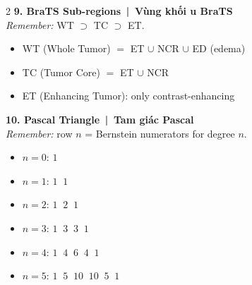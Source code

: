 \begin{multicols}{2}
\textbf{9. BraTS Sub-regions \,|\, Vùng khối u BraTS}\\
\emph{Remember:} WT $\supset$ TC $\supset$ ET.
\begin{itemize}
\item WT (Whole Tumor) $=$ ET $\cup$ NCR $\cup$ ED (edema)
\item TC (Tumor Core) $=$ ET $\cup$ NCR
\item ET (Enhancing Tumor): only contrast-enhancing
\end{itemize}

\textbf{10. Pascal Triangle \,|\, Tam giác Pascal}\\
\emph{Remember:} row $n$ = Bernstein numerators for degree $n$.
\begin{itemize}
\item $n{=}0$:\; $1$
\item $n{=}1$:\; $1\;\;1$
\item $n{=}2$:\; $1\;\;2\;\;1$
\item $n{=}3$:\; $1\;\;3\;\;3\;\;1$
\item $n{=}4$:\; $1\;\;4\;\;6\;\;4\;\;1$
\item $n{=}5$:\; $1\;\;5\;\;10\;\;10\;\;5\;\;1$
\end{itemize}

\end{multicols}

